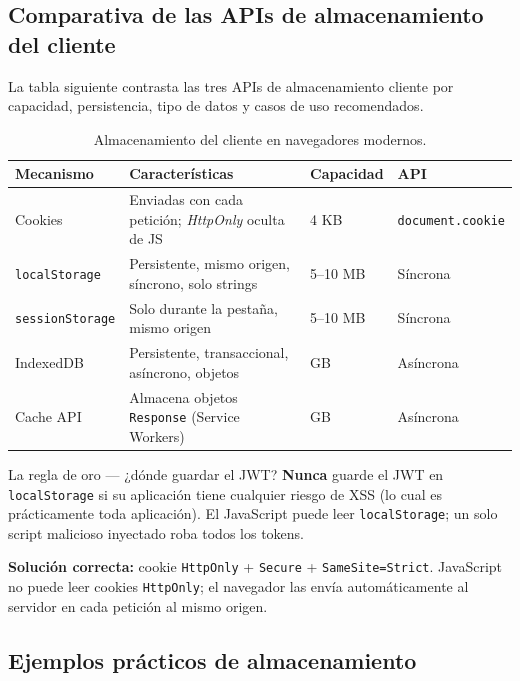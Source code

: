 \subsection{Comparativa de las APIs de almacenamiento del cliente}

La tabla siguiente contrasta las tres APIs de almacenamiento
cliente por capacidad, persistencia, tipo de datos y casos de uso
recomendados.


\begin{table}[htbp]
\centering
\caption{Almacenamiento del cliente en navegadores modernos.}
\footnotesize
\begin{tabularx}{\textwidth}{lXll}
\toprule
\textbf{Mecanismo} & \textbf{Características} & \textbf{Capacidad} & \textbf{API}\\
\midrule
Cookies & Enviadas con cada petición; \emph{HttpOnly} oculta de JS & 4 KB & \texttt{document.cookie}\\
\texttt{localStorage} & Persistente, mismo origen, síncrono, solo strings & 5--10 MB & Síncrona\\
\texttt{sessionStorage} & Solo durante la pestaña, mismo origen & 5--10 MB & Síncrona\\
IndexedDB & Persistente, transaccional, asíncrono, objetos & GB & Asíncrona\\
Cache API & Almacena objetos \texttt{Response} (Service Workers) & GB & Asíncrona\\
\bottomrule
\end{tabularx}
\end{table}

\begin{cajaadvertencia}{La regla de oro --- ¿dónde guardar el JWT?}
\textbf{Nunca} guarde el JWT en \texttt{localStorage} si su aplicación
tiene cualquier riesgo de XSS (lo cual es prácticamente toda
aplicación). El JavaScript puede leer \texttt{localStorage}; un solo
script malicioso inyectado roba todos los tokens.

\textbf{Solución correcta:} cookie \texttt{HttpOnly} + \texttt{Secure}
+ \texttt{SameSite=Strict}. JavaScript no puede leer cookies
\texttt{HttpOnly}; el navegador las envía automáticamente al servidor
en cada petición al mismo origen.
\end{cajaadvertencia}

\subsection{Ejemplos prácticos de almacenamiento}

